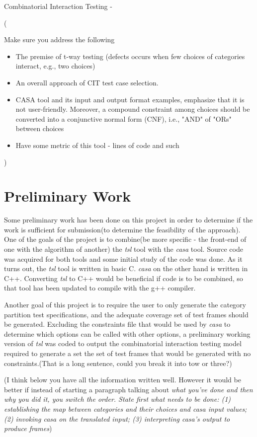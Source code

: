 \documentclass[a4full,12pt]{article}
\newcommand{\eas}[1]{{\color{blue}\sf ({#1})}}
\begin{document}
Combinatorial Interaction Testing -
\eas{Make sure you address the following
\begin{itemize}
\item The premise of t-way testing (defects occurs when few choices of categories interact, e.g., two choices)
\item An overall approach of CIT test case selection.
\item CASA tool and its input and output format examples, emphasize that it is not user-friendly. Moreover, a compound constraint among choices should be converted into a conjunctive normal form (CNF), i.e., "AND" of "ORs" between choices
\item Have some metric of this tool - lines of code and such
\end{itemize}
}

\section{Preliminary Work}
Some preliminary work has been done on this project in order to determine if
  the work is sufficient for submission\eas{to determine the feasibility of the approach}. One of the goals of the project is to
  combine\eas{be more specific - the front-end of one with the algorithm of another} the \emph{tsl} tool with the \emph{casa} tool. Source code was
  acquired for both tools and some initial study of the code was done. As it
  turns out, the \emph{tsl} tool is written in basic C. \emph{casa} on the other
  hand is written in C++. Converting \emph{tsl} to C++ would be beneficial if
  code is to be combined, so that tool has been updated to compile with the g++
  compiler.

  
Another goal of this project is to require the user to only generate the
  category partition test specifications, and the adequate coverage set of test
  frames should be generated.  Excluding the constraints file that would be used 
  by \emph{casa} to determine which options can be called with other options, a
  preliminary working version of \emph{tsl} was coded to output the 
  combinatorial interaction testing model required to generate a set the set of
  test frames that would be generated with no constraints.\eas{That is a long sentence, could you break it into tow or three?} 
  
    
  \eas{I think below you have all the information written well. However it would be better if instead of starting a paragraph talking about \em{what you've done} and then \em{why you did it}, you switch the order. State first what needs to be done: (1) establishing the map between categories and their choices and casa input values; (2) invoking casa on the translated input; (3) interpreting casa's output to produce frames}
  
\end{document}
